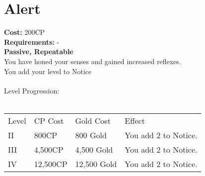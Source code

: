 \section{Alert}\label{perk:alert}
\textbf{Cost:} 200CP\\
\textbf{Requirements:} -\\
\textbf{Passive, Repeatable}\\
You have honed your senses and gained increased reflexes.\\
You add your level to Notice\\
\\
Level Progression:\\
\\
\begin{tabular}{l | l | l | l}
	Level & CP Cost & Gold Cost & Effect\\
	II & 800CP & 800 Gold & You add 2 to Notice.\\
	III & 4,500CP & 4,500 Gold & You add 2 to Notice.\\
	IV & 12,500CP & 12,500 Gold & You add 2 to Notice.\\
\end{tabular}
